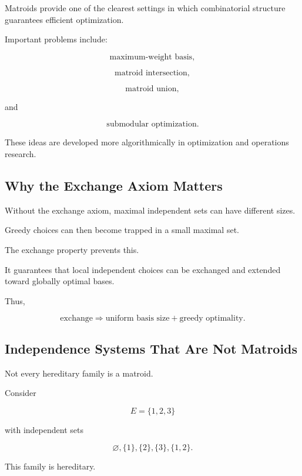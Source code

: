 Matroids provide one of the clearest settings in which combinatorial
structure guarantees efficient optimization.

Important problems include:

\[
\boxed{
\text{maximum-weight basis},
}
\]

\[
\boxed{
\text{matroid intersection},
}
\]

\[
\boxed{
\text{matroid union},
}
\]

and

\[
\boxed{
\text{submodular optimization}.
}
\]

These ideas are developed more algorithmically in optimization and
operations research.

\subsection{Why the Exchange Axiom Matters}
\label{subsec:why-exchange-matters}

Without the exchange axiom, maximal independent sets can have different
sizes.

Greedy choices can then become trapped in a small maximal set.

The exchange property prevents this.

It guarantees that local independent choices can be exchanged and
extended toward globally optimal bases.

Thus,

\[
\boxed{
\text{exchange}
\Longrightarrow
\text{uniform basis size}
+
\text{greedy optimality}.
}
\]

\subsection{Independence Systems That Are Not Matroids}
\label{subsec:nonmatroid-independence-systems}

Not every hereditary family is a matroid.

Consider

\[
E=\{1,2,3\}
\]

with independent sets

\[
\varnothing,
\{1\},
\{2\},
\{3\},
\{1,2\}.
\]

This family is hereditary.

